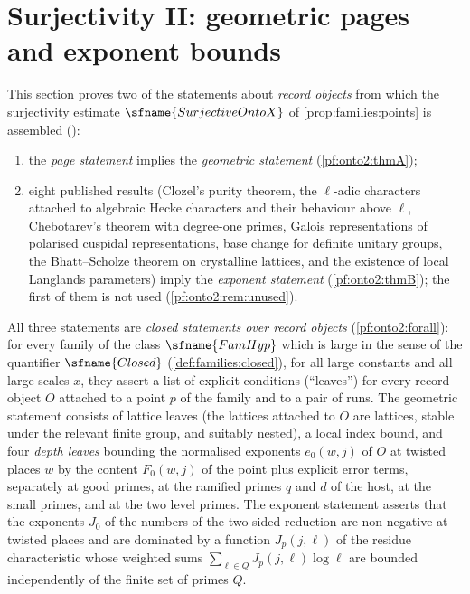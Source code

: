 \section{Surjectivity II: geometric pages and exponent bounds}\label{sec:pf:onto2}

\providecommand{\ontoIIix}{\operatorname{ix}}
\providecommand{\ontoIITw}{\mathrm{Tw}}
\providecommand{\ontoIIcut}{\operatorname{cut}}
\providecommand{\ontoIIeig}{\operatorname{eig}}
\providecommand{\ontoIIexp}{\operatorname{ex}}
\providecommand{\ontoIIJA}{J^{\mathrm{A}}}
\providecommand{\ontoIIJr}{J^{\mathrm{rec}}}
\providecommand{\ontoIIJu}{J^{\mathrm{u}}}
\providecommand{\ontoIIloc}[2]{{#2}_{(#1)}}
\providecommand{\ontoIIRB}{\mathrm{RB}}
\providecommand{\ontoIIPN}{\mathrm{PN}}
\providecommand{\ontoIICl}{\mathrm{Cl}}
\providecommand{\ontoIILI}{\mathrm{LI}}

This section proves two of the statements about \emph{record objects} from which the surjectivity estimate
$\sfname{SurjectiveOntoX}$ of \cref{prop:families:points} is assembled
():
\begin{enumerate}[label=(\Alph*)]
\item the \emph{page statement} implies the \emph{geometric statement} (\cref{pf:onto2:thmA});
\item eight published results (Clozel's purity theorem, the $\ell$-adic characters attached to algebraic Hecke
  characters and their behaviour above $\ell$, Chebotarev's theorem with degree-one primes, Galois representations of
  polarised cuspidal representations, base change for definite unitary groups, the Bhatt--Scholze theorem on
  crystalline lattices, and the existence of local Langlands parameters) imply the \emph{exponent statement}
  (\cref{pf:onto2:thmB}); the first of them is not used (\cref{pf:onto2:rem:unused}).
\end{enumerate}
All three statements are \emph{closed statements over record objects} (\cref{pf:onto2:forall}): for every family of
the class $\sfname{FamHyp}$ which is large in the sense of the quantifier $\sfname{Closed}$ (\cref{def:families:closed}),
for all large constants and all large scales $x$, they assert a list of explicit conditions (``leaves'') for every
record object $O$ attached to a point $p$ of the family and to a pair of runs. The geometric statement consists of
lattice leaves (the lattices attached to $O$ are lattices, stable under the relevant finite group, and suitably
nested), a local index bound, and four \emph{depth leaves} bounding the normalised exponents $e_0(w,j)$ of $O$ at
twisted places $w$ by the content $F_0(w,j)$ of the point plus explicit error terms, separately at good primes, at
the ramified primes $q$ and $d$ of the host, at the small primes, and at the two level primes. The exponent statement
asserts that the exponents $J_0$ of the numbers of the two-sided reduction are non-negative at twisted places and are
dominated by a function $J_p(j,\ell)$ of the residue characteristic whose weighted sums
$\sum_{\ell\in Q}J_p(j,\ell)\log\ell$ are bounded independently of the finite set of primes $Q$.

